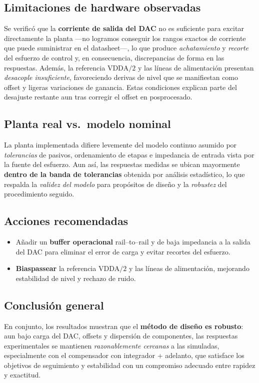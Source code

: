 \subsection*{Limitaciones de hardware observadas}
Se verificó que la \textbf{corriente de salida del DAC} no es suficiente para excitar directamente la planta ---no logramos conseguir los rangos exactos de corriente que puede suministrar en el datasheet---, lo que produce \emph{achatamiento} y \emph{recorte} del esfuerzo de control y, en consecuencia, discrepancias de forma en las respuestas. Además, la referencia $\mathrm{VDDA}/2$ y las líneas de alimentación presentan \emph{desacople insuficiente}, favoreciendo derivas de nivel que se manifiestan como offset y ligeras variaciones de ganancia. Estas condiciones explican parte del desajuste restante aun tras corregir el offset en posprocesado.

\subsection*{Planta real vs.\ modelo nominal}
La planta implementada difiere levemente del modelo continuo asumido por \emph{tolerancias} de pasivos, ordenamiento de etapas e impedancia de entrada vista por la fuente del esfuerzo. Aun así, las respuestas medidas se ubican mayormente \textbf{dentro de la banda de tolerancias} obtenida por análisis estadístico, lo que respalda la \emph{validez del modelo} para propósitos de diseño y la \emph{robustez} del procedimiento seguido.



\subsection*{Acciones recomendadas}
\begin{itemize}
	\item Añadir un \textbf{buffer operacional} rail–to–rail y de baja impedancia a la salida del DAC para eliminar el error de carga y evitar recortes del esfuerzo.
	\item \textbf{Biaspassear} la referencia $\mathrm{VDDA}/2$ y las líneas de alimentación, mejorando estabilidad de nivel y rechazo de ruido.
\end{itemize}

\subsection*{Conclusión general}
En conjunto, los resultados muestran que el \textbf{método de diseño es robusto}: aun bajo carga del DAC, offsets y dispersión de componentes, las respuestas experimentales se mantienen \emph{razonablemente cercanas} a las simuladas, especialmente con el compensador  con integrador + adelanto, que satisface los objetivos de seguimiento y estabilidad con un compromiso adecuado entre rapidez y exactitud.
